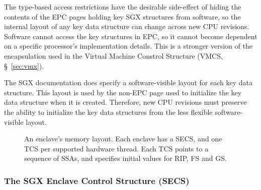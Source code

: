 The type-based access restrictions have the desirable side-effect of hiding the
contents of the EPC pages holding key SGX structures from software, so the
internal layout of any key data structure can change across new CPU revisions.
Software cannot access the key structures in EPC, so it cannot become dependent
on a specific processor's implementation details. This is a stronger version of
the encapsulation used in the Virtual Machine Constrol Structure
(VMCS, \S~\ref{sec:vmx}).

The SGX documentation does specify a software-visible layout for each key data
structure. This layout is used by the non-EPC page used to initialize the key
data structure when it is created. Therefore, new CPU revisions must preserve
the ability to initialize the key data structures from the less flexible
software-visible layout.

\begin{figure}[hbt!]
  \caption{
    An enclave's memory layout. Each enclave has a SECS, and one TCS per
    supported hardware thread. Each TCS points to a sequence of SSAs, and
    specifies initial values for RIP, FS and GS.
  }
  \label{fig:enclave_layout}
\end{figure}

\subsubsection{The SGX Enclave Control Structure (SECS)}
\label{sec:secs}

